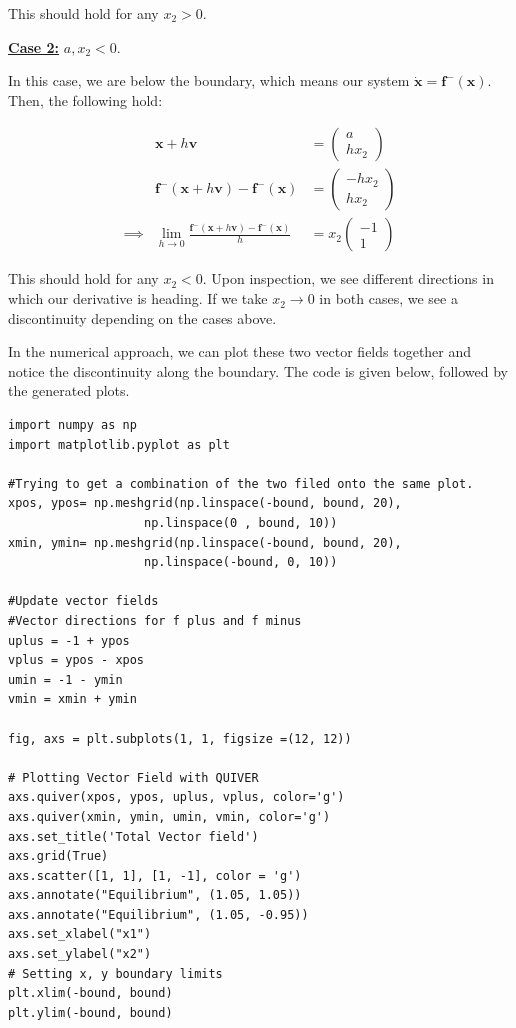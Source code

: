 \begin{solution}
This should hold for any $x_2 > 0$.

\newpage
\jump
\underline{\textbf{Case 2:}} $a, x_2 < 0$.
\jump

In this case, we are below the boundary, which means our system $\dot{\textbf{x}} = \textbf{f}^-(\textbf{x})$. Then, the following hold:

\alignbreak
\begin{align}
    &\textbf{x} + h\textbf{v} &= \begin{pmatrix} a\\hx_2\end{pmatrix}\nonumber\\
    &\textbf{f}^-(\textbf{x} + h\textbf{v}) - \textbf{f}^-(\textbf{x}) &= \begin{pmatrix} -hx_2\\ hx_2\end{pmatrix}\nonumber\\
    \implies &\lim_{h \rightarrow 0} \frac{\textbf{f}^-(\textbf{x} + h\textbf{v}) - \textbf{f}^-(\textbf{x})}{h} &= x_2\begin{pmatrix}-1\\1\end{pmatrix}\nonumber
\end{align}
\alignbreak

This should hold for any $x_2 < 0$. Upon inspection, we see different directions in which our derivative is heading. If we take $x_2 \rightarrow 0$ in both cases, we see a discontinuity depending on the cases above.

\jump
In the numerical approach, we can plot these two vector fields together and notice the discontinuity along the boundary. The code is given below, followed by the generated plots.

\begin{lstlisting}
import numpy as np 
import matplotlib.pyplot as plt 

#Trying to get a combination of the two filed onto the same plot.
xpos, ypos= np.meshgrid(np.linspace(-bound, bound, 20),  
                   np.linspace(0 , bound, 10)) 
xmin, ymin= np.meshgrid(np.linspace(-bound, bound, 20),  
                   np.linspace(-bound, 0, 10)) 

#Update vector fields
#Vector directions for f plus and f minus
uplus = -1 + ypos
vplus = ypos - xpos
umin = -1 - ymin
vmin = xmin + ymin

fig, axs = plt.subplots(1, 1, figsize =(12, 12))

# Plotting Vector Field with QUIVER 
axs.quiver(xpos, ypos, uplus, vplus, color='g') 
axs.quiver(xmin, ymin, umin, vmin, color='g') 
axs.set_title('Total Vector field') 
axs.grid(True)
axs.scatter([1, 1], [1, -1], color = 'g')
axs.annotate("Equilibrium", (1.05, 1.05))
axs.annotate("Equilibrium", (1.05, -0.95))
axs.set_xlabel("x1")
axs.set_ylabel("x2")
# Setting x, y boundary limits 
plt.xlim(-bound, bound) 
plt.ylim(-bound, bound) 
  

\end{lstlisting}
\end{solution}
